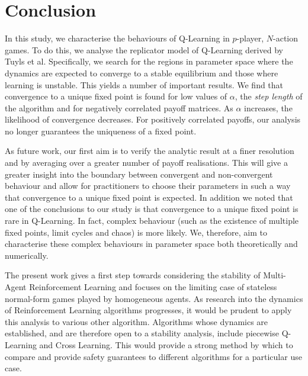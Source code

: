 \documentclass[sigconf]{aamas}
\begin{document}

\section{Conclusion}

In this study, we characterise the behaviours of Q-Learning in $p$-player, $N$-action games. To do this, we analyse the replicator model of Q-Learning derived by Tuyls et al. Specifically, we search for the regions in parameter space where the dynamics are expected to converge to a stable equilibrium and those where learning is unstable. This yields a number of important results. We find that convergence to a unique fixed point is found for low values of $\alpha$, the \textit{step length} of the algorithm and for negatively correlated payoff matrices. As $\alpha$ increases, the likelihood of convergence decreases. For positively correlated payoffs, our analysis no longer guarantees the uniqueness of a fixed point. 


As future work, our first aim is to verify the analytic result at a finer resolution and by averaging over a greater number of payoff realisations. This will give a greater insight into the boundary between convergent and non-convergent behaviour and allow for practitioners to choose their parameters in such a way that convergence to a unique fixed point is expected. In addition we noted that one of the conclusions to our study is that convergence to a unique fixed point is rare in Q-Learning. In fact, complex behaviour (such as the existence of multiple fixed points, limit cycles and chaos) is more likely. We, therefore, aim to characterise these complex behaviours in parameter space both theoretically and numerically.

The present work gives a first step towards considering the stability of Multi-Agent Reinforcement Learning and focuses on the limiting case of stateless normal-form games played by homogeneous agents. As research into the dynamics of Reinforcement Learning algorithms progresses, it would be prudent to apply this analysis to various other algorithm. Algorithms whose dynamics are established, and are therefore open to a stability analysis, include piecewise Q-Learning and Cross Learning. This would provide a strong method by which to compare and provide safety guarantees to different algorithms for a particular use case. 

\end{document}

